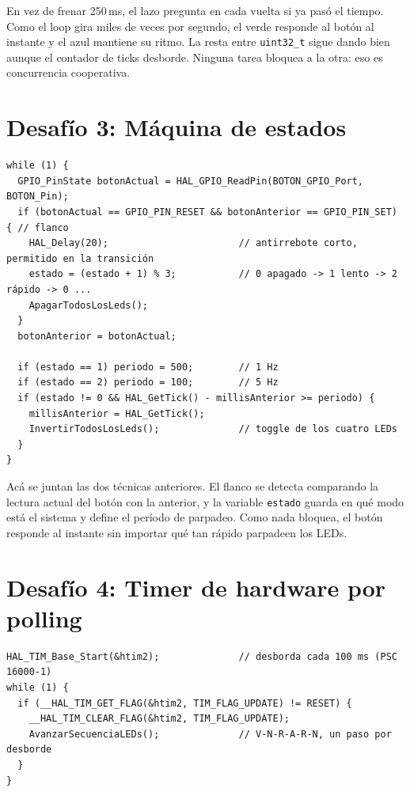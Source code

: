 \documentclass[11pt,a4paper]{article}
\begin{document}
En vez de frenar 250\,ms, el lazo pregunta en cada vuelta si ya pasó el tiempo. Como el loop gira
miles de veces por segundo, el verde responde al botón al instante y el azul mantiene su ritmo.
La resta entre \texttt{uint32\_t} sigue dando bien aunque el contador de ticks desborde. Ninguna
tarea bloquea a la otra: eso es concurrencia cooperativa.

\section*{Desafío 3: Máquina de estados}

\begin{lstlisting}
while (1) {
  GPIO_PinState botonActual = HAL_GPIO_ReadPin(BOTON_GPIO_Port, BOTON_Pin);
  if (botonActual == GPIO_PIN_RESET && botonAnterior == GPIO_PIN_SET) { // flanco
    HAL_Delay(20);                       // antirrebote corto, permitido en la transición
    estado = (estado + 1) % 3;           // 0 apagado -> 1 lento -> 2 rápido -> 0 ...
    ApagarTodosLosLeds();
  }
  botonAnterior = botonActual;

  if (estado == 1) periodo = 500;        // 1 Hz
  if (estado == 2) periodo = 100;        // 5 Hz
  if (estado != 0 && HAL_GetTick() - millisAnterior >= periodo) {
    millisAnterior = HAL_GetTick();
    InvertirTodosLosLeds();              // toggle de los cuatro LEDs
  }
}
\end{lstlisting}

Acá se juntan las dos técnicas anteriores. El flanco se detecta comparando la lectura actual del
botón con la anterior, y la variable \texttt{estado} guarda en qué modo está el sistema y define
el período de parpadeo. Como nada bloquea, el botón responde al instante sin importar qué tan
rápido parpadeen los LEDs.

\section*{Desafío 4: Timer de hardware por polling}

\begin{lstlisting}
HAL_TIM_Base_Start(&htim2);              // desborda cada 100 ms (PSC 16000-1)
while (1) {
  if (__HAL_TIM_GET_FLAG(&htim2, TIM_FLAG_UPDATE) != RESET) {
    __HAL_TIM_CLEAR_FLAG(&htim2, TIM_FLAG_UPDATE);
    AvanzarSecuenciaLEDs();              // V-N-R-A-R-N, un paso por desborde
  }
}
\end{lstlisting}
\end{document}
